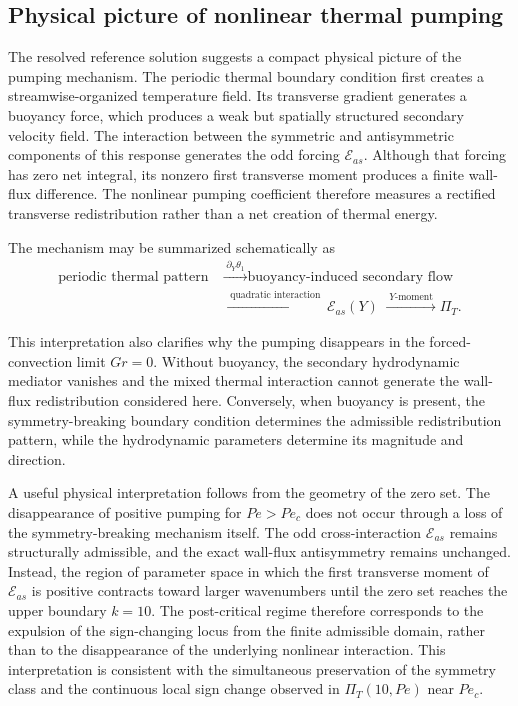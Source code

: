 \documentclass[12pt,a4paper]{article}
\newcommand{\Pe}{\mathit{Pe}}
\newcommand{\Grr}{\mathit{Gr}}
\newcommand{\PiT}{\Pi_T}
\begin{document}
\subsection{Physical picture of nonlinear thermal pumping}
\label{subsec:physical_picture}

The resolved reference solution suggests a compact physical picture of the
pumping mechanism. The periodic thermal boundary condition first creates a
streamwise-organized temperature field. Its transverse gradient generates a
buoyancy force, which produces a weak but spatially structured secondary
velocity field. The interaction between the symmetric and antisymmetric
components of this response generates the odd forcing
$\mathcal{E}_{as}$. Although that forcing has zero net integral, its nonzero
first transverse moment produces a finite wall-flux difference. The nonlinear
pumping coefficient therefore measures a rectified transverse redistribution
rather than a net creation of thermal energy.

The mechanism may be summarized schematically as
\begin{equation*}
\begin{aligned}
\text{periodic thermal pattern}
&\;\xrightarrow{\;\partial_Y\theta_1\;}
\text{buoyancy-induced secondary flow} \\
&\;\xrightarrow{\;\text{quadratic interaction}\;}
\mathcal{E}_{as}(Y)
\;\xrightarrow{\;Y\text{-moment}\;}
\PiT .
\end{aligned}
\end{equation*}

This interpretation also clarifies why the pumping disappears in the
forced-convection limit $\Grr=0$. Without buoyancy, the secondary
hydrodynamic mediator vanishes and the mixed thermal interaction cannot
generate the wall-flux redistribution considered here. Conversely, when
buoyancy is present, the symmetry-breaking boundary condition determines the
admissible redistribution pattern, while the hydrodynamic parameters
determine its magnitude and direction.

A useful physical interpretation follows from the geometry of the zero set.
The disappearance of positive pumping for $\Pe>\Pe_c$ does not occur through
a loss of the symmetry-breaking mechanism itself. The odd cross-interaction
$\mathcal{E}_{as}$ remains structurally admissible, and the exact wall-flux
antisymmetry remains unchanged. Instead, the region of parameter space in
which the first transverse moment of $\mathcal{E}_{as}$ is positive contracts
toward larger wavenumbers until the zero set reaches the upper boundary
$k=10$. The post-critical regime therefore corresponds to the expulsion of
the sign-changing locus from the finite admissible domain, rather than to the
disappearance of the underlying nonlinear interaction. This interpretation
is consistent with the simultaneous preservation of the symmetry class and
the continuous local sign change observed in $\PiT(10,\Pe)$ near $\Pe_c$.
\end{document}
